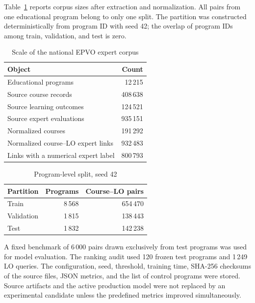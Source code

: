 \documentclass[twoside,11pt]{article}
\begin{document}
Table~\ref{tab:dataset-scale} reports corpus sizes after extraction and normalization. All pairs from one educational program belong to only one split. The partition was constructed deterministically from program ID with seed 42; the overlap of program IDs among train, validation, and test is zero.

\begin{table}[H]
\centering
\caption{Scale of the national EPVO expert corpus}
\label{tab:dataset-scale}
\small
\begin{tabularx}{0.88\linewidth}{>{\raggedright\arraybackslash}X r}
\toprule
\textbf{Object} & \textbf{Count}\\
\midrule
Educational programs & 12\,215\\
Source course records & 408\,638\\
Source learning outcomes & 124\,521\\
Source expert evaluations & 935\,151\\
Normalized courses & 191\,292\\
Normalized course--LO expert links & 932\,483\\
Links with a numerical expert label & 800\,793\\
\bottomrule
\end{tabularx}
\end{table}

\begin{table}[H]
\centering
\caption{Program-level split, seed 42}
\label{tab:dataset-split}
\small
\begin{tabular}{lrr}
\toprule
\textbf{Partition} & \textbf{Programs} & \textbf{Course--LO pairs}\\
\midrule
Train & 8\,568 & 654\,470\\
Validation & 1\,815 & 138\,443\\
Test & 1\,832 & 142\,238\\
\bottomrule
\end{tabular}
\end{table}

A fixed benchmark of 6\,000 pairs drawn exclusively from test programs was used for model evaluation. The ranking audit used 120 frozen test programs and 1\,249 LO queries. The configuration, seed, threshold, training time, SHA-256 checksums of the source files, JSON metrics, and the list of control programs were stored. Source artifacts and the active production model were not replaced by an experimental candidate unless the predefined metrics improved simultaneously.
\end{document}
